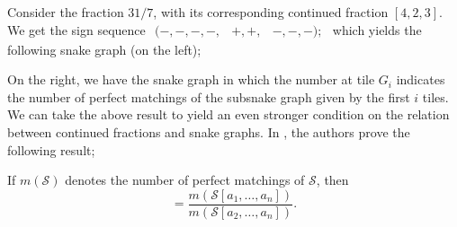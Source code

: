 \begin{example}\label{Ex3.5}
Consider the fraction $31/7$, with its corresponding continued fraction $[4,2,3]$. We get the sign sequence
$
\begin{array}{ccc}
  ( -,-,-,-,&  +,+,&  -,-,-);
\end{array}
$
which yields the following snake graph (on the left);
\begin{figure}[H]
    \centering
    
\end{figure}
\end{example}
On the right, we have the snake graph in which the number at tile $G_i$ indicates the number of perfect matchings of the subsnake graph given by the first $i$ tiles.  
We can take the above result to yield an even stronger condition on the relation between continued fractions and snake graphs. In \cite{CS2}, the authors prove the following result;
\begin{theorem}\label{thm3.6}
    If $m(\mathcal{S})$ denotes the number of perfect matchings of $\mathcal{S}$, then
    \begin{equation*}
        [a_1,\dots,a_n] = \dfrac{m(\mathcal{S}[a_1,\dots,a_n])}{m(\mathcal{S}[a_2,\dots,a_n])}.
    \end{equation*}
\end{theorem}
